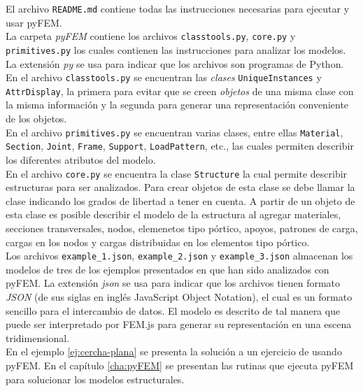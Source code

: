 El archivo \verb|README.md| contiene todas las instrucciones necesarias para ejecutar y usar pyFEM.\\


La carpeta \emph{pyFEM} contiene los archivos \verb|classtools.py|, \verb|core.py| y \verb|primitives.py| los cuales contienen las instrucciones para analizar los modelos. La extensión \emph{py} se usa para indicar que los archivos son programas de Python.\\

En el archivo \verb|classtools.py| se encuentran las \emph{clases} \verb|UniqueInstances| y \verb|AttrDisplay|, la primera para evitar que se creen \emph{objetos} de una misma clase con la misma información y la segunda para generar una representación conveniente de los objetos.\\

En el archivo \verb|primitives.py| se encuentran varias clases, entre ellas \verb|Material|, \verb|Section|, \verb|Joint|, \verb|Frame|, \verb|Support|, \verb|LoadPattern|, etc., las cuales permiten describir los diferentes atributos del modelo.\\

En el archivo \verb|core.py| se encuentra la clase \verb|Structure| la cual permite describir estructuras para ser analizados. Para crear objetos de esta clase se debe llamar la clase indicando los grados de libertad a tener en cuenta. A partir de un objeto de esta clase es posible describir el modelo de la estructura al agregar materiales, secciones transversales, nodos, elemenetos tipo pórtico, apoyos, patrones de carga, cargas en los nodos y cargas distribuidas en los elementos tipo pórtico.\\

Los archivos \verb|example_1.json|, \verb|example_2.json| y \verb|example_3.json| almacenan los modelos de tres de los ejemplos presentados en \cite{escamilla1995microcomputadores} que han sido analizados con pyFEM. La extensión \emph{json} se usa para indicar que los archivos tienen formato \emph{JSON} (de sus siglas en inglés JavaScript Object Notation), el cual es un formato sencillo para el intercambio de datos. El modelo es descrito de tal manera que puede ser interpretado por FEM.js para generar su representación en una escena tridimensional. \\

En el ejemplo \ref{ej:cercha-plana} se presenta la solución a un ejercicio de \cite{escamilla1995microcomputadores} usando pyFEM. En el capítulo \ref{cha:pyFEM} se presentan las rutinas que ejecuta pyFEM para solucionar los modelos estructurales.\\

